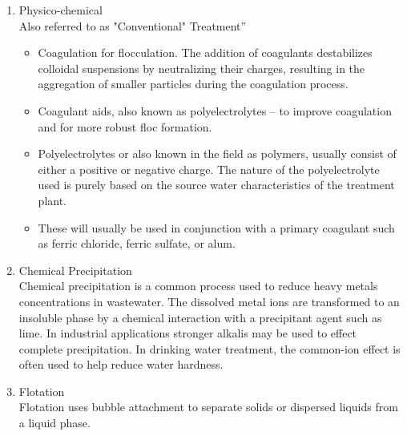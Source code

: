 \begin{enumerate}
\begin{itemize}
\end{itemize}
\item Physico-chemical\\
Also referred to as "Conventional" Treatment”
\begin{itemize}
\item Coagulation for flocculation. The addition of coagulants destabilizes colloidal suspensions by neutralizing their charges, resulting in the aggregation of smaller particles during the coagulation process.
\item Coagulant aids, also known as polyelectrolytes – to improve coagulation and for more robust floc formation.
\item Polyelectrolytes or also known in the field as polymers, usually consist of either a positive or negative charge. The nature of the polyelectrolyte used is purely based on the source water characteristics of the treatment plant.
\item These will usually be used in conjunction with a primary coagulant such as ferric chloride, ferric sulfate, or alum.
\end{itemize}
\item Chemical Precipitation\\
Chemical precipitation is a common process used to reduce heavy metals concentrations in wastewater. The dissolved metal ions are transformed to an insoluble phase by a chemical interaction with a precipitant agent such as lime. In industrial applications stronger alkalis may be used to effect complete precipitation. In drinking water treatment, the common-ion effect is often used to help reduce water hardness.
\item Flotation\\
Flotation uses bubble attachment to separate solids or dispersed liquids from a liquid phase.


\end{enumerate}
